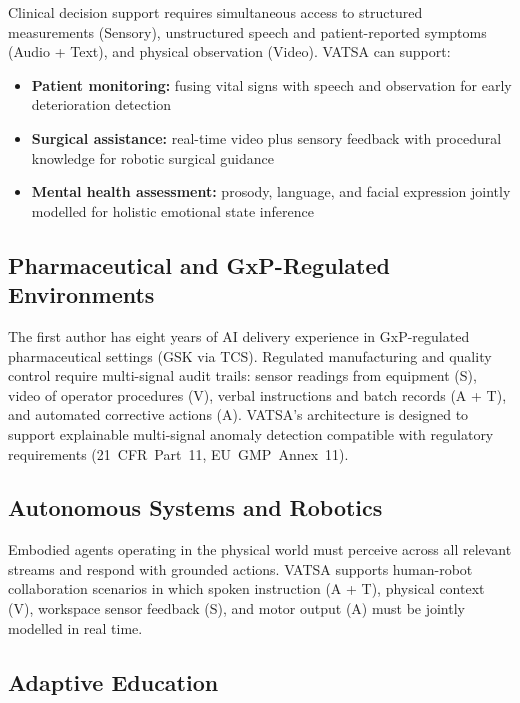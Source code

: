 \documentclass[11pt,a4paper]{article}
\begin{document}
Clinical decision support requires simultaneous access to structured measurements
(Sensory), unstructured speech and patient-reported symptoms (Audio + Text), and
physical observation (Video).  VATSA can support:

\begin{itemize}[leftmargin=2em]
  \item \textbf{Patient monitoring:} fusing vital signs with speech and observation
        for early deterioration detection
  \item \textbf{Surgical assistance:} real-time video plus sensory feedback with
        procedural knowledge for robotic surgical guidance
  \item \textbf{Mental health assessment:} prosody, language, and facial expression
        jointly modelled for holistic emotional state inference
\end{itemize}

\subsection{Pharmaceutical and GxP-Regulated Environments}

The first author has eight years of AI delivery experience in GxP-regulated
pharmaceutical settings (GSK via TCS).  Regulated manufacturing and quality control
require multi-signal audit trails: sensor readings from equipment (S), video of
operator procedures (V), verbal instructions and batch records (A + T), and automated
corrective actions (A).  VATSA's architecture is designed to support explainable
multi-signal anomaly detection compatible with regulatory requirements
(21~CFR~Part~11, EU~GMP~Annex~11).

\subsection{Autonomous Systems and Robotics}

Embodied agents operating in the physical world must perceive across all relevant
streams and respond with grounded actions.  VATSA supports human-robot collaboration
scenarios in which spoken instruction (A + T), physical context (V), workspace
sensor feedback (S), and motor output (A) must be jointly modelled in real time.

\subsection{Adaptive Education}
\end{document}
